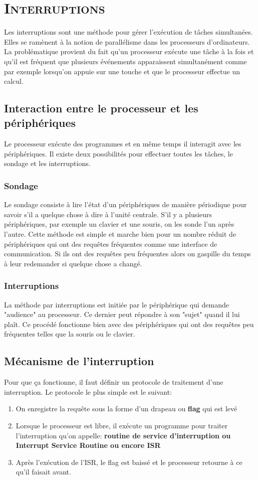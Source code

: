 \chapter{\textsc{Interruptions}}

Les interruptions sont une méthode pour gérer l'exécution de tâches simultanées. Elles se ramènent à la notion de parallélisme dans les processeurs d'ordinateurs. La problématique provient du fait qu'un processeur exécute une tâche à la fois et qu'il est fréquent que plusieurs événements apparaissent simultanément comme par exemple lorsqu'on appuie sur une touche et que le processeur effectue un calcul. 

\section{Interaction entre le processeur et les périphériques}
Le processeur exécute des programmes et en même temps il interagit avec les périphériques. Il existe deux possibilités pour effectuer toutes les tâches, le sondage et les interruptions.

\subsection{Sondage}
Le sondage consiste à lire l'état d'un périphériques de manière périodique pour savoir s'il a quelque chose à dire à l'unité centrale. S'il y a plusieurs périphériques, par exemple un clavier et une souris, on les sonde l'un après l'autre. Cette méthode est simple et marche bien pour un nombre réduit de périphériques qui ont des requêtes fréquentes comme une interface de communication. Si ils ont des requêtes peu fréquentes alors on gaspille du temps à leur redemander si quelque chose a changé.

\subsection{Interruptions}
La méthode par interruptions est initiée par le périphérique qui demande "audience" au processeur. Ce dernier peut répondre à son "sujet" quand il lui plaît. Ce procédé fonctionne bien avec des périphériques qui ont des requêtes peu fréquentes telles que la souris ou le clavier.

\section{Mécanisme de l'interruption}
Pour que ça fonctionne, il faut définir un protocole de traitement d'une interruption. Le protocole le plus simple est le suivant:
\begin{enumerate}
\item On enregistre la requête sous la forme d'un drapeau ou \textbf{flag} qui est levé
\item Lorsque le processeur est libre, il exécute un programme pour traiter l'interruption qu'on appelle: \textbf{routine de service d'interruption ou Interrupt Service Routine ou encore ISR}
\item Après l'exécution de l'ISR, le flag est baissé et le processeur retourne à ce qu'il faisait avant.
\end{enumerate}

